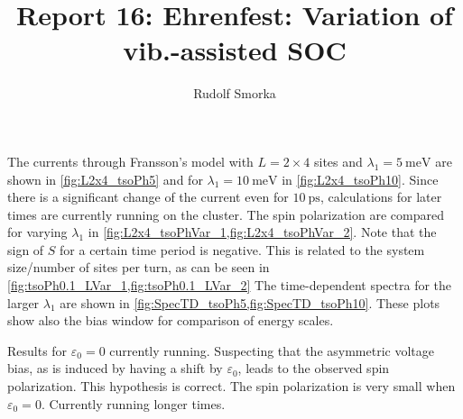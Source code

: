 \documentclass{article}
\begin{document}
\title{Report 16: Ehrenfest: Variation of vib.-assisted SOC}
\author{Rudolf Smorka}
\maketitle
The currents through Fransson's model with $L=2\times 4$ sites and $\lambda_1=\SI{5}{\milli\electronvolt}$ are shown in \cref{fig:L2x4_tsoPh5} and for $\lambda_1=\SI{10}{\milli\electronvolt}$ in \cref{fig:L2x4_tsoPh10}. Since there is a significant change of the current even for $\SI{10}{\pico\second}$, calculations for later times are currently running on the cluster.
The spin polarization are compared for varying $\lambda_1$ in \cref{fig:L2x4_tsoPhVar_1,fig:L2x4_tsoPhVar_2}. Note that the sign of $S$ for a certain time period is negative. This is related to the system size/number of sites per turn, as can be seen in \cref{fig:tsoPh0.1_LVar_1,fig:tsoPh0.1_LVar_2}
The time-dependent spectra for the larger $\lambda_1$ are shown in \cref{fig:SpecTD_tsoPh5,fig:SpecTD_tsoPh10}. These plots show also the bias window for comparison of energy scales.

{\color{red} Results for $\varepsilon_0=0$ currently running. Suspecting that the asymmetric voltage bias, as is induced by having a shift by $\varepsilon_0$, leads to the observed spin polarization. This hypothesis is correct. The spin polarization is very small when $\varepsilon_0=0$. Currently running longer times.}
\end{document}
